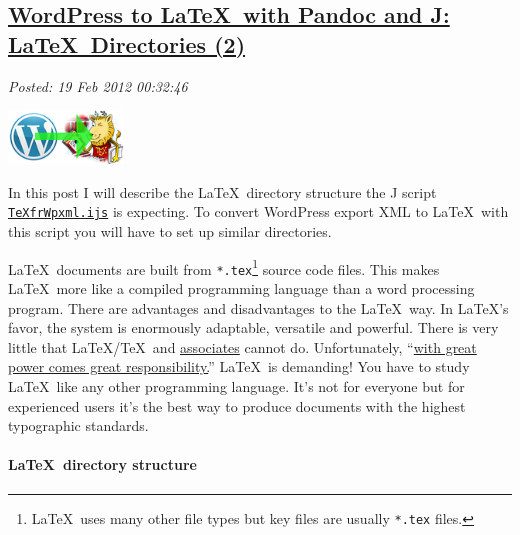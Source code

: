 %

\subsection*{\href{https://bakerjd99.wordpress.com/2012/02/18/wordpress-to-latex-with-pandoc-and-j-latex-directories-part-2-2/}{WordPress to \LaTeX\ with Pandoc and J: \LaTeX\ Directories (2)}}


\noindent\emph{Posted: 19 Feb 2012 00:32:46}
\vspace{6pt}

\captionsetup[floatingfigure]{labelformat=empty}
\begin{floatingfigure}[r]{0.25\textwidth}
\centering
\includegraphics[width=0.23\textwidth]{i-mNK4RHL-M.png}
\caption{WordPress to \LaTeX}
\label{fig:2374X0}
\end{floatingfigure}In this post I will describe the \LaTeX\ directory structure the J script
\href{https://github.com/bakerjd99/jacks/blob/master/texfrwpxml/TeXfrWpxml.ijs}{\texttt{TeXfrWpxml.ijs}}
is expecting. To convert WordPress export XML to \LaTeX\ with this script
you will have to set up similar directories.

\LaTeX\ documents are built from \texttt{*.tex}\footnote{
\LaTeX\ uses many other file types but key files
are usually \texttt{*.tex} files.
} source code files.
This makes \LaTeX\ more like a compiled programming language than a word
processing program. There are advantages and disadvantages to the \LaTeX\
way. In \LaTeX's favor, the system is enormously adaptable, versatile and
powerful. There is very little that \LaTeX/\TeX\ and
\href{http://www.amazon.com/LaTeX-Companions-Third-Revised-Boxed/dp/0321514432}{associates}
cannot do. Unfortunately,
``\href{http://www.youtube.com/watch?v=IKmQW7JTb6s}{with great power
comes great responsibility.}'' \LaTeX\ is demanding! You have to study
\LaTeX\ like any other programming language. It's not for everyone but for
experienced users it's the best way to produce documents with the
highest typographic standards.

\paragraph{\LaTeX\ directory structure}

